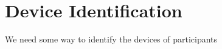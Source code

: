 
\section{Device Identification}
\label{sec:device_identification}


We need some way to identify the devices of participants 